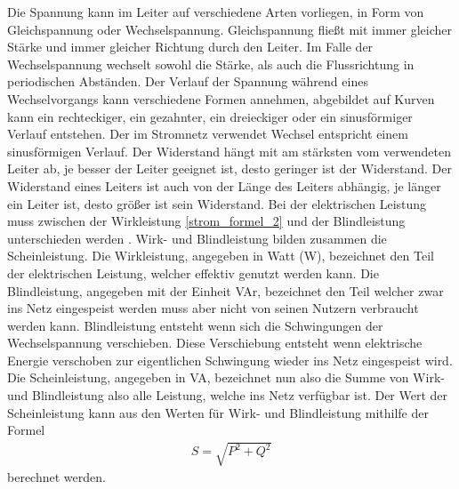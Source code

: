 Die Spannung kann im Leiter auf verschiedene Arten vorliegen, in Form von Gleichspannung oder Wechselspannung. Gleichspannung fließt mit immer gleicher Stärke und immer gleicher Richtung durch den Leiter. Im Falle der Wechselspannung wechselt sowohl die Stärke, als auch die Flussrichtung in periodischen Abständen. Der Verlauf der Spannung während eines Wechselvorgangs kann verschiedene Formen annehmen, abgebildet auf Kurven kann ein rechteckiger, ein gezahnter, ein dreieckiger oder ein sinusförmiger Verlauf entstehen. Der im Stromnetz verwendet Wechsel entspricht einem sinusförmigen Verlauf. Der Widerstand hängt mit am stärksten vom verwendeten Leiter ab, je besser der Leiter geeignet ist, desto geringer ist der Widerstand. Der Widerstand eines Leiters ist auch von der Länge des Leiters abhängig, je länger ein Leiter ist, desto größer ist sein Widerstand. Bei der elektrischen Leistung muss zwischen der Wirkleistung \ref{strom_formel_2} und der Blindleistung unterschieden werden \cite{strom_leistung}. Wirk- und Blindleistung bilden zusammen die Scheinleistung. Die Wirkleistung, angegeben in Watt (W), bezeichnet den Teil der elektrischen Leistung, welcher effektiv genutzt werden kann. Die Blindleistung, angegeben mit der Einheit VAr, bezeichnet den Teil welcher zwar ins Netz eingespeist werden muss aber nicht von seinen Nutzern verbraucht werden kann. Blindleistung entsteht wenn sich die Schwingungen der Wechselspannung verschieben. Diese Verschiebung entsteht wenn elektrische Energie verschoben zur eigentlichen Schwingung wieder ins Netz eingespeist wird. Die Scheinleistung, angegeben in VA, bezeichnet nun also die Summe von Wirk- und Blindleistung also alle Leistung, welche ins Netz verfügbar ist. Der Wert der Scheinleistung kann aus den Werten für Wirk- und Blindleistung mithilfe der Formel
\begin{align}
	S = \sqrt{P^{2}+Q^{2}}
	\label{strom_formel_3}
\end{align}
berechnet werden.

